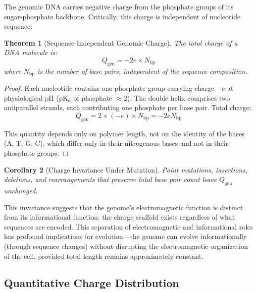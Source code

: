 \documentclass[twocolumn,10pt,aps,prd,superscriptaddress,floatfix,nofootinbib]{revtex4-2}
\newtheorem{theorem}{Theorem}[section]
\newtheorem{corollary}[theorem]{Corollary}
\theoremstyle{remark}
\begin{document}
The genomic DNA carries negative charge from the phosphate groups of its sugar-phosphate backbone. Critically, this charge is independent of nucleotide sequence:

\begin{theorem}[Sequence-Independent Genomic Charge]
\label{thm:sequence_independent}
The total charge of a DNA molecule is:
\begin{equation}
Q_{\mathrm{gen}} = -2e \times N_{\mathrm{bp}}
\label{eq:genome_charge}
\end{equation}
where $N_{\mathrm{bp}}$ is the number of base pairs, independent of the sequence composition.
\end{theorem}

\begin{proof}
Each nucleotide contains one phosphate group carrying charge $-e$ at physiological pH (pK$_a$ of phosphate $\approx 2$). The double helix comprises two antiparallel strands, each contributing one phosphate per base pair. Total charge:
\begin{equation}
Q_{\mathrm{gen}} = 2 \times (-e) \times N_{\mathrm{bp}} = -2e N_{\mathrm{bp}}
\end{equation}

This quantity depends only on polymer length, not on the identity of the bases (A, T, G, C), which differ only in their nitrogenous bases and not in their phosphate groups.
\end{proof}

\begin{corollary}[Charge Invariance Under Mutation]
\label{cor:mutation_invariance}
Point mutations, insertions, deletions, and rearrangements that preserve total base pair count leave $Q_{\mathrm{gen}}$ unchanged.
\end{corollary}

This invariance suggests that the genome's electromagnetic function is distinct from its informational function: the charge scaffold exists regardless of what sequences are encoded. This separation of electromagnetic and informational roles has profound implications for evolution---the genome can evolve informationally (through sequence changes) without disrupting the electromagnetic organization of the cell, provided total length remains approximately constant.

\subsection{Quantitative Charge Distribution}
\end{document}
